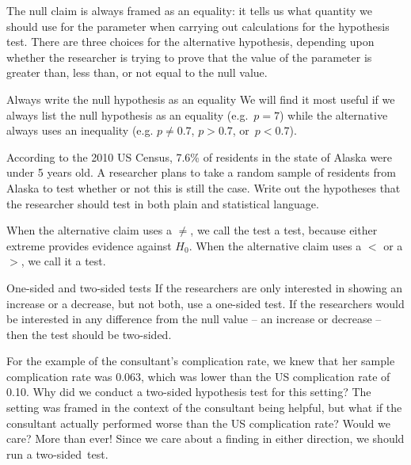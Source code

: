 The null claim is always framed as an equality: it tells us what quantity we should use for the parameter when carrying out calculations for the hypothesis test. There are three choices for the alternative hypothesis, depending upon whether the researcher is trying to prove that the value of the parameter is greater than, less than, or not equal to the null value.

\begin{onebox}{Always write the null hypothesis as an equality}
We will find it most useful if we always list the null hypothesis as an equality (e.g.~$p = 7$) while the alternative always uses an inequality (e.g. $p \neq 0.7$, $p>0.7$, or~$p<0.7$).\end{onebox}

\begin{exercisewrap}
\begin{nexercise}
According to the 2010 US Census, 7.6\% of residents in the state of Alaska were under 5 years old. A researcher plans to take a random sample of residents from Alaska to test whether or not this is still the case. Write out the hypotheses that the researcher should test in both plain and statistical language.\footnotemark
\end{nexercise}
\end{exercisewrap}

When the alternative claim uses a $\neq$, we call the test a  test, because either extreme provides evidence against $H_0$. When the alternative claim uses a $<$ or a $>$, we call it a  test.

\begin{onebox}{One-sided and two-sided tests}
If the researchers are only interested in showing an increase or a decrease, but not both, use a one-sided test. If the researchers would be interested in any difference from the null value -- an increase or decrease -- then the test should be two-sided.\vspace{0.5mm}\end{onebox}

\begin{examplewrap}
\begin{nexample}{For the example of the consultant's complication rate, we knew that her sample complication rate was 0.063, which was lower than the US complication rate of 0.10. Why did we conduct a two-sided hypothesis test for this setting?}
The setting was framed in the context of the consultant being helpful, but what if the consultant actually performed worse than the US complication rate? Would we care? More than ever! Since we care about a finding in either direction, we should run a two-sided~test.
\end{nexample}
\end{examplewrap}

